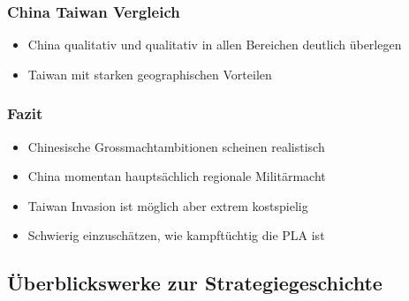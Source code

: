 {}\documentclass[a4paper]{article}
\providecommand{\tightlist}{\setlength{\itemsep}{1mm}\setlength{\parskip}{1mm}}
\begin{document}
\subsubsection{China Taiwan Vergleich}\label{china-taiwan-vergleich}

\begin{itemize}
	\tightlist
	\item
	      China qualitativ und qualitativ in allen Bereichen deutlich überlegen
	\item
	      Taiwan mit starken geographischen Vorteilen
\end{itemize}

\subsubsection{Fazit}\label{fazit-8}

\begin{itemize}
	\tightlist
	\item
	      Chinesische Grossmachtambitionen scheinen realistisch
	\item
	      China momentan hauptsächlich regionale Militärmacht
	\item
	      Taiwan Invasion ist möglich aber extrem kostspielig
	\item
	      Schwierig einzuschätzen, wie kampftüchtig die PLA ist
\end{itemize}

\subsection{Überblickswerke zur
	Strategiegeschichte}\label{uxfcberblickswerke-zur-strategiegeschichte}
\end{document}
